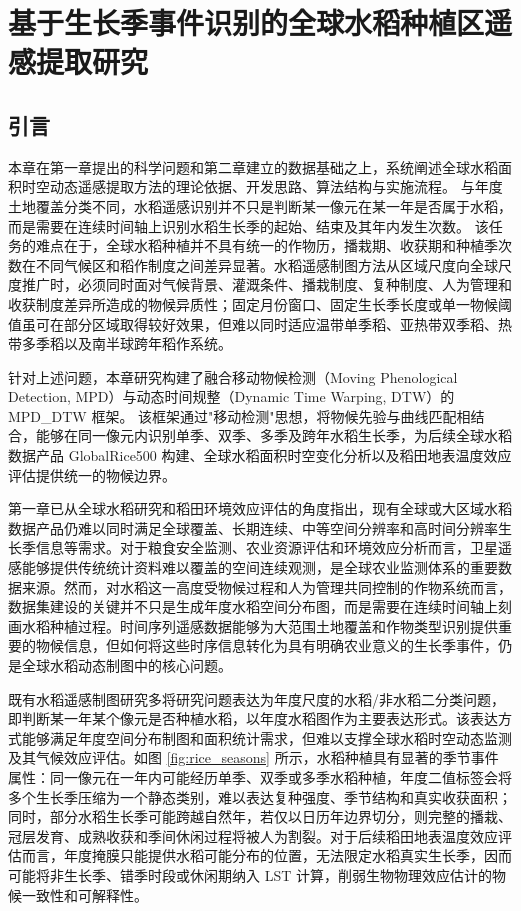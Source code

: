 \chapter{基于生长季事件识别的全球水稻种植区遥感提取研究}


\section{引言}

本章在第一章提出的科学问题和第二章建立的数据基础之上，系统阐述全球水稻面积时空动态遥感提取方法的理论依据、开发思路、算法结构与实施流程。
与年度土地覆盖分类不同，水稻遥感识别并不只是判断某一像元在某一年是否属于水稻，而是需要在连续时间轴上识别水稻生长季的起始、结束及其年内发生次数。
该任务的难点在于，全球水稻种植并不具有统一的作物历，播栽期、收获期和种植季次数在不同气候区和稻作制度之间差异显著\cite{Laborte2017SciData}。水稻遥感制图方法从区域尺度向全球尺度推广时，必须同时面对气候背景、灌溉条件、播栽制度、复种制度、人为管理和收获制度差异所造成的物候异质性；固定月份窗口、固定生长季长度或单一物候阈值虽可在部分区域取得较好效果，但难以同时适应温带单季稻、亚热带双季稻、热带多季稻以及南半球跨年稻作系统\cite{Dong2016}。

针对上述问题，本章研究构建了融合移动物候检测（Moving Phenological Detection, MPD）与动态时间规整（Dynamic Time Warping, DTW）的 MPD\_DTW 框架。
该框架通过"移动检测"思想，将物候先验与曲线匹配相结合，能够在同一像元内识别单季、双季、多季及跨年水稻生长季，为后续全球水稻数据产品 GlobalRice500 构建、全球水稻面积时空变化分析以及稻田地表温度效应评估提供统一的物候边界。

第一章已从全球水稻研究和稻田环境效应评估的角度指出，现有全球或大区域水稻数据产品仍难以同时满足全球覆盖、长期连续、中等空间分辨率和高时间分辨率生长季信息等需求。对于粮食安全监测、农业资源评估和环境效应分析而言，卫星遥感能够提供传统统计资料难以覆盖的空间连续观测，是全球农业监测体系的重要数据来源\cite{Fritz2019,Whitcraft2019RSE}。然而，对水稻这一高度受物候过程和人为管理共同控制的作物系统而言，数据集建设的关键并不只是生成年度水稻空间分布图，而是需要在连续时间轴上刻画水稻种植过程。时间序列遥感数据能够为大范围土地覆盖和作物类型识别提供重要的物候信息，但如何将这些时序信息转化为具有明确农业意义的生长季事件，仍是全球水稻动态制图中的核心问题\cite{Gomez2016ISPRS}。

既有水稻遥感制图研究多将研究问题表达为年度尺度的水稻/非水稻二分类问题，即判断某一年某个像元是否种植水稻，以年度水稻图作为主要表达形式\cite{Xiao2005,Xiao2006,Gumma2011SouthAsiaRice,Han2021,Sun2023SEAsiaRice20m}。该表达方式能够满足年度空间分布制图和面积统计需求，但难以支撑全球水稻时空动态监测及其气候效应评估。如图 \ref{fig:rice_seasons} 所示，水稻种植具有显著的季节事件属性：同一像元在一年内可能经历单季、双季或多季水稻种植，年度二值标签会将多个生长季压缩为一个静态类别，难以表达复种强度、季节结构和真实收获面积；同时，部分水稻生长季可能跨越自然年，若仅以日历年边界切分，则完整的播栽、冠层发育、成熟收获和季间休闲过程将被人为割裂。对于后续稻田地表温度效应评估而言，年度掩膜只能提供水稻可能分布的位置，无法限定水稻真实生长季，因而可能将非生长季、错季时段或休闲期纳入 LST 计算，削弱生物物理效应估计的物候一致性和可解释性。


